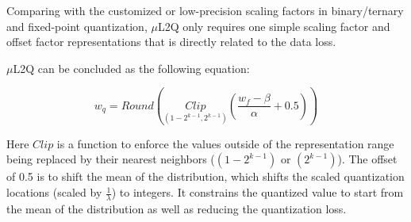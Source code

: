 
Comparing with the customized or low-precision scaling factors in binary/ternary and fixed-point quantization, $\mu$L2Q only requires one simple scaling factor and offset factor representations that is directly related to the data loss. 



$\mu$L2Q can be concluded as the following equation:

\begin{equation}
    \label{eqn:ulq_method}
    w_q = Round(\underset{(1-2^{k-1},2^{k-1})}{Clip}(\frac{w_f-\beta}{\alpha} + 0.5))
\end{equation}

Here $Clip$ is a function to enforce the values outside of the representation range being replaced by their nearest neighbors ($(1-2^{k-1})$ or $(2^{k-1})$).
The offset of 0.5 is to shift the mean of the distribution, which shifts the scaled quantization locations (scaled by $\frac{1}{\lambda}$) to integers. It constrains the quantized value to start from the mean of the distribution as well as reducing the quantization loss.


